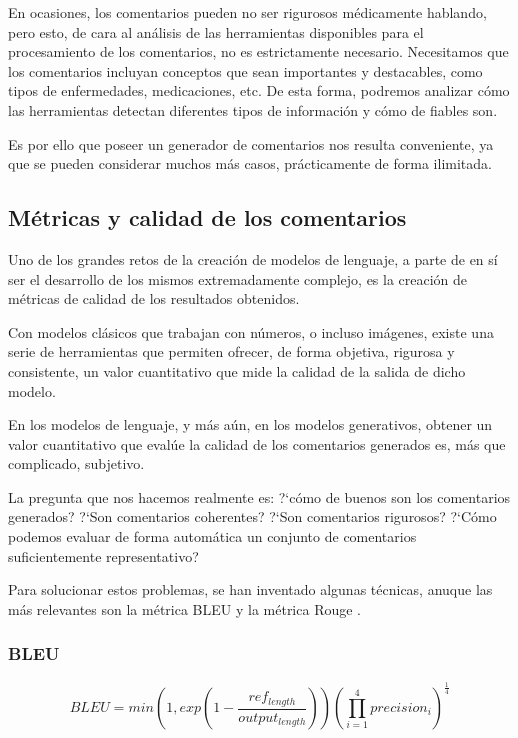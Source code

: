 En ocasiones, los comentarios pueden no ser rigurosos médicamente hablando, pero esto, de cara al análisis de las herramientas disponibles para el procesamiento de los comentarios, no es estrictamente necesario. Necesitamos que los comentarios incluyan conceptos que sean importantes y destacables, como tipos de enfermedades, medicaciones, etc. De esta forma, podremos analizar cómo las herramientas detectan diferentes tipos de información y cómo de fiables son. 

Es por ello que poseer un generador de comentarios nos resulta conveniente, ya que se pueden considerar muchos más casos, prácticamente de forma ilimitada.

\subsection{Métricas y calidad de los comentarios}

Uno de los grandes retos de la creación de modelos de lenguaje, a parte de en sí ser el desarrollo de los mismos extremadamente complejo, es la creación de métricas de calidad de los resultados obtenidos.

Con modelos clásicos que trabajan con números, o incluso imágenes, existe una serie de herramientas que permiten ofrecer, de forma objetiva, rigurosa y consistente, un valor cuantitativo que mide la calidad de la salida de dicho modelo.

En los modelos de lenguaje, y más aún, en los modelos generativos, obtener un valor cuantitativo que evalúe la calidad de los comentarios generados es, más que complicado, subjetivo.

La pregunta que nos hacemos realmente es: ?`cómo de buenos son los comentarios generados? ?`Son comentarios coherentes? ?`Son comentarios rigurosos? ?`Cómo podemos evaluar de forma automática un conjunto de comentarios suficientemente representativo?

Para solucionar estos problemas, se han inventado algunas técnicas, anuque las más relevantes son la métrica BLEU \cite{BLEU} y la métrica Rouge \cite{lin2004rouge}.

\subsubsection{BLEU}

\begin{equation}
	BLEU = min\left( 1, exp\left( 1 - \frac{ref_{length}}{output_{length}} \right) \right) \left( \prod^{4}_{i=1} precision_i \right)^{\frac{1}{4}}
\end{equation}

